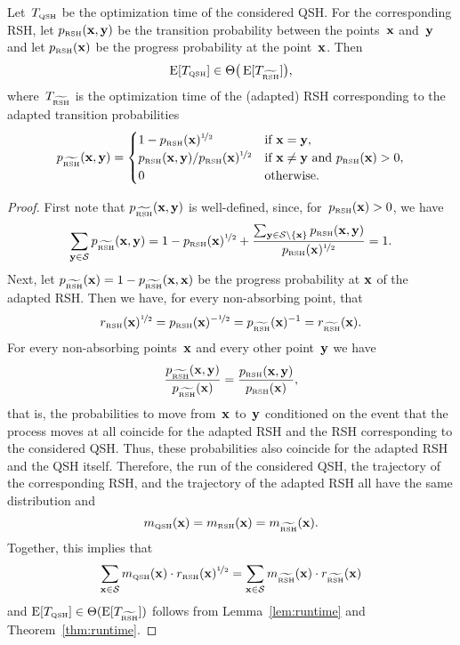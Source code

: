 \documentclass[a4paper,11pt]{article}
\begin{document}
\begin{theorem}
\label{thm:scaling}
Let~$T_{\text{\tiny\rm QSH}}$ be the optimization time of the considered QSH. For the corresponding RSH, let $p_\RSH(\xvec,\yvec)$ be the transition probability between the points~$\xvec$ and~$\yvec$ and let $p_\RSH(\xvec)$ be the progress probability at the point~$\xvec$. Then
\[
\operatorname{E}[T_{\text{\tiny\rm QSH}}]\in \Theta\big(\operatorname{E}[T_{\widetilde{\text{\tiny\rm RSH}}}]\big),
\]
where~$T_{\widetilde{\text{\tiny\rm RSH}}}$ is the optimization time of the (adapted) RSH corresponding to the adapted transition probabilities
\begin{equation*}
p_{\widetilde{\RSH}}(\xvec,\yvec)=\begin{cases}
1-p_\RSH(\xvec)^{\nicefrac{1}{2}} & \text{if }\xvec=\yvec,\\
p_\RSH(\xvec,\yvec)/p_\RSH(\xvec)^{\nicefrac{1}{2}} & \text{if }\xvec\neq\yvec\text{ and }p_\RSH(\xvec)>0,\\
0 & \text{otherwise}.
\end{cases}
\end{equation*}
\end{theorem}

\begin{proof}
First note that $p_{\widetilde{\RSH}}(\xvec,\yvec)$ is well-defined, since, for~$p_\RSH(\xvec)>0$, we have
\[
\sum_{\yvec\in\mathcal{S}}p_{\widetilde{\RSH}}(\xvec,\yvec)=1-p_\RSH(\xvec)^{\nicefrac{1}{2}}+\frac{\sum_{\yvec\in\mathcal{S}\setminus\{\xvec\}}p_\RSH(\xvec,\yvec)}{p_\RSH(\xvec)^{\nicefrac{1}{2}}}=1.
\]
Next, let $p_{\widetilde{\RSH}}(\xvec) = 1-p_{\widetilde{\RSH}}(\xvec,\xvec)$ be the progress probability at $\xvec$ of the adapted RSH. Then we have, for every non-absorbing point, that
\[
r_\RSH(\xvec)^{\nicefrac{1}{2}}= p_\RSH(\xvec)^{-\nicefrac{1}{2}}=p_{\widetilde{\RSH}}(\xvec)^{-1}=r_{\widetilde{\RSH}}(\xvec).
\]
For every non-absorbing points~$\xvec$ and every other point~$\yvec$ we have
\[
\frac{p_{\widetilde{\RSH}}(\xvec,\yvec)}{p_{\widetilde{\RSH}}(\xvec)}=\frac{p_\RSH(\xvec,\yvec)}{p_\RSH(\xvec)},
\]
that is, the probabilities to move from~$\xvec$ to~$\yvec$ conditioned on the event that the process moves at all coincide for the adapted RSH and the RSH corresponding to the considered QSH. Thus, these probabilities also coincide for the adapted RSH and the QSH itself. Therefore, the run of the considered QSH, the trajectory of the corresponding RSH, and the trajectory of the adapted RSH all have the same distribution and
\[
m_\QSH(\xvec)=m_\RSH(\xvec)=m_{\widetilde{\RSH}}(\xvec).
\]
Together, this implies that
\[
\sum_{\xvec\in\mathcal{S}} m_\QSH(\xvec)\cdot r_\RSH(\xvec)^{\nicefrac{1}{2}}=\sum_{\xvec\in\mathcal{S}} m_{\widetilde{\RSH}}(\xvec)\cdot r_{\widetilde{\RSH}}(\xvec)
\]
and $\operatorname{E}[T_{\text{\tiny\rm QSH}}]\in \Theta(\operatorname{E}[T_{\widetilde{\text{\tiny\rm RSH}}}])$ follows from Lemma~\ref{lem:runtime} and Theorem~\ref{thm:runtime}.
\end{proof}
\end{document}
